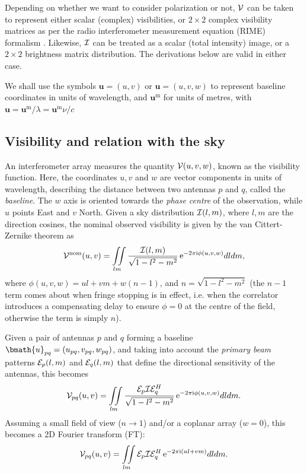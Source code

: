 \documentclass[useAMS,usenatbib]{mn2e}
\newcommand{\ee}{\mathrm{e}}
\newcommand{\ii}{\mathrm{i}}
\begin{document}
Depending on whether we want to consider polarization or not, $\mathcal{V}$ can be taken to represent either 
scalar (complex) visibilities, or $2\times2$ complex visibility matrices  as per the radio interferometer 
measurement equation (RIME) formalism \citep{smirnov2011revisiting}. Likewise, $\mathcal{I}$ can be treated as a scalar 
(total intensity) image, or a $2\times2$ brightness matrix distribution. The derivations below 
are valid in either case.

We shall use the symbols $\mathbf{u}=(u,v)$ or $\mathbf{u}=(u,v,w)$ to represent baseline coordinates in units of wavelength, and 
$\mathbf{u}^\mathrm{m}$ for units of metres, with $\mathbf{u} = \mathbf{u}^\mathrm{m}/\lambda = \mathbf{u}^\mathrm{m}\nu/c$

\subsection{Visibility and relation with the sky}
\label{sec:visSky}
An interferometer array measures the quantity $\mathcal{V}(u,v,w)$, known as the visibility function.
Here, the coordinates $u,v$ and $w$ are vector components in units of wavelength, describing the distance between 
two antennas $p$ and $q$, called the \emph{baseline}. The $w$ axis is oriented towards the \emph{phase centre} of the observation,
while $u$ points East and $v$ North. Given a sky distribution $\mathcal{I}(l,m)$, where $l,m$ are the direction cosines,
the nominal observed visibility is given by the van 
Cittert-Zernike theorem \citep{thompson1999fundamentals} as
\begin{equation}
\VV^\mathrm{nom}(u,v) =\iint\limits_{lm} \frac{\II(l,m)}{\sqrt{1-l^2 - m^2}}\,\ee^{-2\pi\ii\phi (u,v,w)}dldm, \label{eq:visSky:nom}
\end{equation} 
where $\phi(u,v,w)=ul+vm+w(n-1)$, and $n=\sqrt{1-l^2 - m^2}$ (the $n-1$ term comes about when fringe 
stopping is in effect, i.e. when 
the correlator introduces a compensating delay to ensure $\phi=0$ at the centre of the field, otherwise the term is simply $n$). 

Given a pair of antennas $p$ and $q$ forming a baseline $\bmath{u}_{pq}=(u_{pq},v_{pq},w_{pq})$, 
and taking into account the \emph{primary beam} patterns $\mathcal{E}_p(l,m)$ and $\mathcal{E}_q(l,m)$ that define the directional sensitivity of 
the antennas, this becomes 
\begin{equation}
\VV_{pq}(u,v)=\iint\limits_{lm} \frac{\EE_p \II \EE_q^H}{\sqrt{1-l^2 - m^2}}\,\ee^{-2\pi\ii\phi (u,v,w)}dldm. \label{eq:visSky}
\end{equation} 
Assuming a small field of view ($n\to 1$) and/or a coplanar array ($w=0$), this becomes a 2D Fourier transform (FT):
\begin{equation}
\VV_{pq}(u,v)=\iint\limits_{lm} \EE_p \II \EE_q^H\,\ee^{-2\pi\ii(ul+vm)}dldm. \label{eq:visSky:2D}
\end{equation} 
\end{document}
